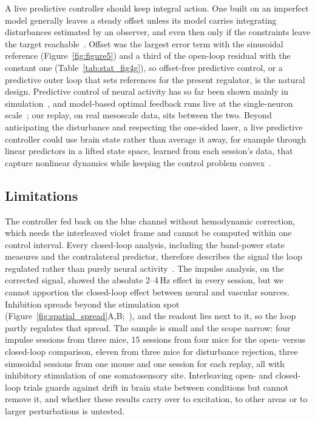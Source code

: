 A live predictive controller should keep integral action. One built on an imperfect model generally leaves a steady offset unless its model carries integrating disturbances estimated by an observer, and even then only if the constraints leave the target reachable~\citep{pannocchia2003disturbance}. Offset was the largest error term with the sinusoidal reference (Figure~\ref{fig:figure5}) and a third of the open-loop residual with the constant one (Table~\ref{tab:stat_fig4g}), so offset-free predictive control, or a predictive outer loop that sets references for the present regulator, is the natural design. Predictive control of neural activity has so far been shown mainly in simulation~\citep{chang2020seizure,steffen2024mpcdbs}, and model-based optimal feedback runs live at the single-neuron scale~\citep{bolus2021state}; our replay, on real mesoscale data, sits between the two. Beyond anticipating the disturbance and respecting the one-sided laser, a live predictive controller could use brain state rather than average it away, for example through linear predictors in a lifted state space, learned from each session's data, that capture nonlinear dynamics while keeping the control problem convex~\citep{korda2018koopman}.

\subsection*{Limitations}

The controller fed back on the blue channel without hemodynamic correction, which needs the interleaved violet frame and cannot be computed within one control interval. Every closed-loop analysis, including the band-power state measures and the contralateral predictor, therefore describes the signal the loop regulated rather than purely neural activity~\citep{valley2020separation}. The impulse analysis, on the corrected signal, showed the absolute 2--4\,Hz effect in every session, but we cannot apportion the closed-loop effect between neural and vascular sources. Inhibition spreads beyond the stimulation spot (Figure~\ref{fig:spatial_spread}A,B;~\citealp{li2019spatiotemporal}), and the readout lies next to it, so the loop partly regulates that spread. The sample is small and the scope narrow: four impulse sessions from three mice, 15 sessions from four mice for the open- versus closed-loop comparison, eleven from three mice for disturbance rejection, three sinusoidal sessions from one mouse and one session for each replay, all with inhibitory stimulation of one somatosensory site. Interleaving open- and closed-loop trials guards against drift in brain state between conditions but cannot remove it, and whether these results carry over to excitation, to other areas or to larger perturbations is untested.
